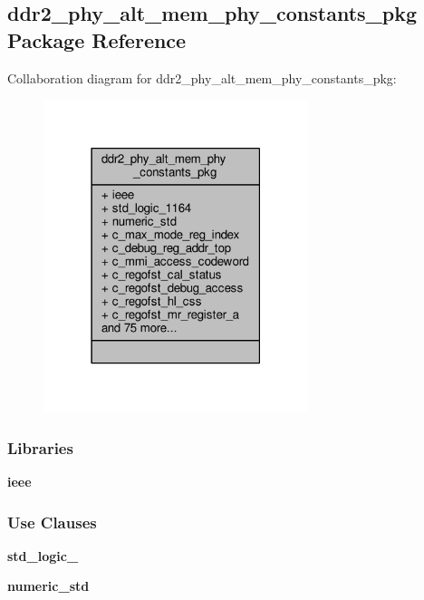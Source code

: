 \subsection{ddr2\+\_\+phy\+\_\+alt\+\_\+mem\+\_\+phy\+\_\+constants\+\_\+pkg Package Reference}
\label{classddr2__phy__alt__mem__phy__constants__pkg}


Collaboration diagram for ddr2\+\_\+phy\+\_\+alt\+\_\+mem\+\_\+phy\+\_\+constants\+\_\+pkg\+:\nopagebreak
\begin{figure}[H]
\begin{center}
\leavevmode
\includegraphics[width=219pt]{d0/d3b/classddr2__phy__alt__mem__phy__constants__pkg__coll__graph}
\end{center}
\end{figure}
\subsubsection*{Libraries}
 \begin{DoxyCompactItemize}
\item 
{\bf ieee} 
\end{DoxyCompactItemize}
\subsubsection*{Use Clauses}
 \begin{DoxyCompactItemize}
\item 
{\bf std\+\_\+logic\+\_}   
\item 
{\bf numeric\+\_\+std}   
\end{DoxyCompactItemize}
